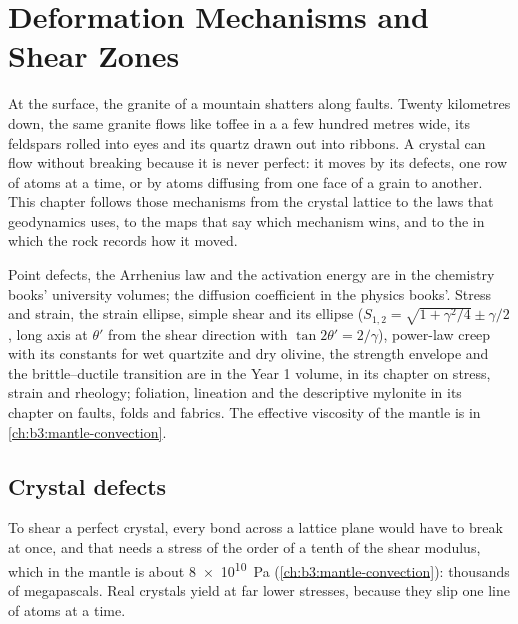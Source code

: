 \chapter{Deformation Mechanisms and Shear Zones}\label{ch:b3:deformation-mechanisms}

At the surface, the granite of a mountain shatters along faults. Twenty
kilometres down, the same granite flows like toffee in a  a few
hundred metres wide, its feldspars rolled into eyes and its quartz drawn out
into ribbons. A crystal can flow without breaking because it is never perfect:
it moves by its defects, one row of atoms at a time, or by atoms diffusing from
one face of a grain to another. This chapter follows those mechanisms from the
crystal lattice to the laws that geodynamics uses, to the maps that say which
mechanism wins, and to the  in which the rock records how it moved.

\begin{recall}
Point defects, the Arrhenius law and the activation energy are in the
chemistry books' university volumes; the diffusion coefficient in the physics
books'. Stress and strain, the strain ellipse, simple shear and its ellipse
($S_{1,2} = \sqrt{1 + \gamma^2/4} \pm \gamma/2$, long axis at $\theta'$ from the
shear direction with $\tan2\theta' = 2/\gamma$), power-law creep with its
constants for wet quartzite and dry olivine, the strength envelope and the
brittle--ductile transition are in the Year 1 volume, in its chapter on
stress, strain and rheology; foliation, lineation and the descriptive
mylonite in its chapter on faults, folds and fabrics. The effective viscosity
of the mantle is in \cref{ch:b3:mantle-convection}.
\end{recall}

\section{Crystal defects}

To shear a perfect crystal, every bond across a lattice plane would have to
break at once, and that needs a stress of the order of a tenth of the shear
modulus, which in the mantle is about \qty{8e10}{Pa}
(\cref{ch:b3:mantle-convection}): thousands of megapascals. Real crystals
yield at far lower stresses, because they slip one line of atoms at a time.

